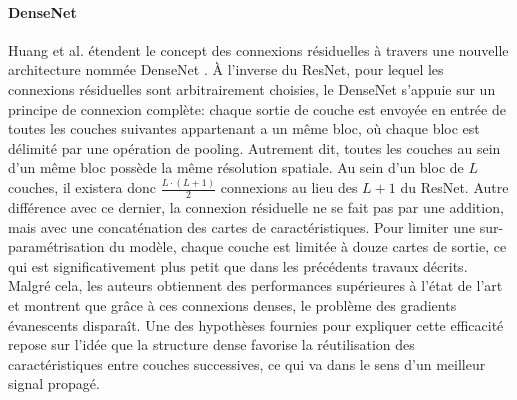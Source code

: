 \paragraph{DenseNet}
Huang et al. étendent le concept des connexions résiduelles à travers une nouvelle architecture nommée DenseNet \cite{huangDenselyConnectedConvolutional2017}. À l'inverse du ResNet, pour lequel les connexions résiduelles sont arbitrairement choisies, le DenseNet s'appuie sur un principe de connexion complète: chaque sortie de couche est envoyée en entrée de toutes les couches suivantes appartenant a un même bloc, où chaque bloc est délimité par une opération de pooling. Autrement dit, toutes les couches au sein d'un même bloc possède la même résolution spatiale. Au sein d'un bloc de $L$ couches, il existera donc $\frac{L\cdot(L+1)}{2}$ connexions au lieu des $L+1$ du ResNet. Autre différence avec ce dernier, la connexion résiduelle ne se fait pas par une addition, mais avec une concaténation des cartes de caractéristiques. Pour limiter une sur-paramétrisation du modèle, chaque couche est limitée à douze cartes de sortie, ce qui est significativement plus petit que dans les précédents travaux décrits. Malgré cela, les auteurs obtiennent des performances supérieures à l'état de l'art et montrent que grâce à ces connexions \og denses\fg, le problème des gradients évanescents disparaît. Une des hypothèses fournies pour expliquer cette efficacité repose sur l'idée que la structure dense favorise la réutilisation des caractéristiques entre couches successives, ce qui va dans le sens d'un meilleur signal propagé.

